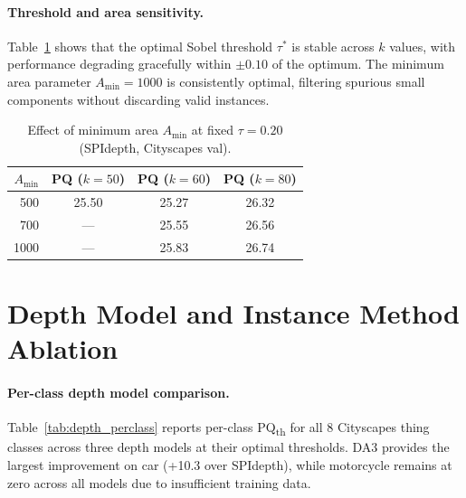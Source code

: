 \documentclass{bmvc2k}
\newcommand{\pqt}{PQ\textsubscript{th}\xspace}
\begin{document}
\paragraph{Threshold and area sensitivity.}
Table~\ref{tab:tau_sensitivity} shows that the optimal Sobel threshold $\tau^*$ is stable across $k$ values, with performance degrading gracefully within $\pm 0.10$ of the optimum. The minimum area parameter $A_\text{min}{=}1000$ is consistently optimal, filtering spurious small components without discarding valid instances.

\begin{table}[h]
\centering
\caption{Effect of minimum area $A_\text{min}$ at fixed $\tau{=}0.20$ (SPIdepth, Cityscapes val).}
\label{tab:tau_sensitivity}
\small
\begin{tabular}{@{}rccc@{}}
\toprule
$A_\text{min}$ & PQ ($k{=}50$) & PQ ($k{=}60$) & PQ ($k{=}80$) \\
\midrule
500 & 25.50 & 25.27 & 26.32 \\
700 & --- & 25.55 & 26.56 \\
1000 & --- & 25.83 & 26.74 \\
\bottomrule
\end{tabular}
\end{table}

\section{Depth Model and Instance Method Ablation}
\label{app:depth_ablation}

\paragraph{Per-class depth model comparison.}
Table~\ref{tab:depth_perclass} reports per-class \pqt for all 8 Cityscapes thing classes across three depth models at their optimal thresholds. DA3 provides the largest improvement on car (+10.3 over SPIdepth), while motorcycle remains at zero across all models due to insufficient training data.
\end{document}
